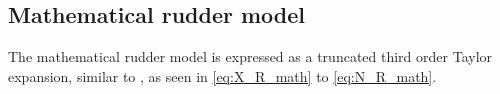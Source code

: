 \subsection{Mathematical rudder model}
\label{sec:mathematical_rudder_model}
The mathematical rudder model is expressed as a truncated third order Taylor expansion, similar to \citet{abkowitz_ship_1964}, as seen in \autoref{eq:X_R_math} to \autoref{eq:N_R_math}.
\begin{equation}
    \label{eq:X_R_math}
    
\end{equation}
%
\begin{equation}
    \label{eq:Y_R_math}
    
\end{equation}
%
\begin{equation}
    \label{eq:N_R_math}
    
\end{equation}